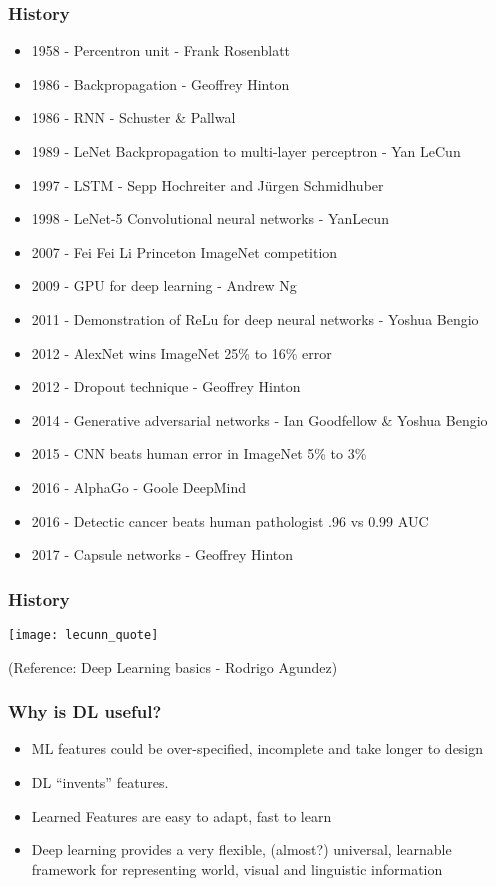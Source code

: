 \begin{frame}[fragile] \frametitle{History}
\begin{itemize}
\item  1958 - Percentron unit - Frank Rosenblatt
\item  1986 - Backpropagation - Geoffrey Hinton
\item 1986 - RNN - Schuster \& Pallwal
\item  1989 - LeNet Backpropagation to multi-layer perceptron - Yan LeCun
\item 1997 - LSTM - Sepp Hochreiter and Jürgen Schmidhuber
\item  1998 - LeNet-5 Convolutional neural networks - YanLecun
\item  2007 - Fei Fei Li Princeton ImageNet competition
\item  2009 - GPU for deep learning - Andrew Ng
\item  2011 - Demonstration of ReLu for deep neural networks - Yoshua Bengio
\item  2012 - AlexNet wins ImageNet 25\% to 16\% error
\item  2012 - Dropout technique - Geoffrey Hinton
\item  2014 - Generative adversarial networks - Ian Goodfellow \& Yoshua Bengio
\item  2015 - CNN beats human error in ImageNet 5\% to 3\%
\item  2016 - AlphaGo - Goole DeepMind
\item  2016 - Detectic cancer beats human pathologist .96 vs 0.99 AUC
\item  2017 - Capsule networks - Geoffrey Hinton
\end{itemize}
\end{frame}

\begin{frame}[fragile] \frametitle{History}
\begin{center}
\texttt{[image: lecunn\_quote]}
\end{center}

\tiny{(Reference: Deep Learning basics - Rodrigo Agundez)}
\end{frame}



\begin{frame}[fragile] \frametitle{Why is DL useful?}
\begin{itemize}
\item ML features could be over-specified, incomplete and take longer to design
\item DL ``invents'' features.
\item Learned Features are easy to adapt, fast to learn
\item Deep learning provides a very flexible, (almost?) universal, learnable framework for representing world, visual and linguistic information
\end{itemize}
\end{frame}

